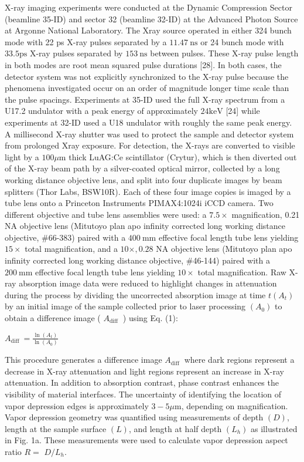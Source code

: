 \documentclass[10pt]{article}
\begin{document}
X-ray imaging experiments were conducted at the Dynamic Compression Sector (beamline 35-ID) and sector 32 (beamline 32-ID) at the Advanced Photon Source at Argonne National Laboratory. The Xray source operated in either 324 bunch mode with 22 ps X-ray pulses separated by a $11.47 \mathrm{~ns}$ or 24 bunch mode with $33.5 \mathrm{ps}$ X-ray pulses separated by $153 \mathrm{~ns}$ between pulses. These X-ray pulse length in both modes are root mean squared pulse durations [28]. In both cases, the detector system was not explicitly synchronized to the X-ray pulse because the phenomena investigated occur on an order of magnitude longer time scale than the pulse spacings. Experiments at 35-ID used the full X-ray spectrum from a U17.2 undulator with a peak energy of approximately $24 \mathrm{keV}$ [24] while experiments at 32-ID used a U18 undulator with roughly the same peak energy. A millisecond X-ray shutter was used to protect the sample and detector system from prolonged Xray exposure. For detection, the X-rays are converted to visible light by a $100 \mu \mathrm{m}$ thick LuAG:Ce scintillator (Crytur), which is then diverted out of the X-ray beam path by a silver-coated optical mirror, collected by a long working distance objective lens, and split into four duplicate images by beam splitters (Thor Labs, BSW10R). Each of these four image copies is imaged by a tube lens onto a Princeton Instruments PIMAX4:1024i iCCD camera. Two different objective and tube lens assemblies were used: a $7.5 \times$ magnification, 0.21 NA objective lens (Mitutoyo plan apo infinity corrected long working distance objective, \#66-383) paired with a $400 \mathrm{~mm}$ effective focal length tube lens yielding $15 \times$ total magnification, and a $10 \times, 0.28$ NA objective lens (Mitutoyo plan apo infinity corrected long working distance objective, \#46-144) paired with a $200 \mathrm{~mm}$ effective focal length tube lens yielding $10 \times$ total magnification. Raw X-ray absorption image data were reduced to highlight changes in attenuation during the process by dividing the uncorrected absorption image at time $t\left(A_{t}\right)$ by an initial image of the sample collected prior to laser processing $\left(A_{0}\right)$ to obtain a difference image ( $A_{\text {diff }}$ ) using Eq. (1):

$A_{\text {diff }}=\frac{\ln \left(A_{t}\right)}{\ln \left(A_{0}\right)}$

This procedure generates a difference image $A_{\text {diff }}$ where dark regions represent a decrease in X-ray attenuation and light regions represent an increase in X-ray attenuation. In addition to absorption contrast, phase contrast enhances the visibility of material interfaces. The uncertainty of identifying the location of vapor depression edges is approximately $3-5 \mu \mathrm{m}$, depending on magnification. Vapor depression geometry was quantified using measurements of depth $(D)$, length at the sample surface $(L)$, and length at half depth $\left(L_{h}\right)$ as illustrated in Fig. 1a. These measurements were used to calculate vapor depression aspect ratio $R=$ $D / L_{h}$.
\end{document}
